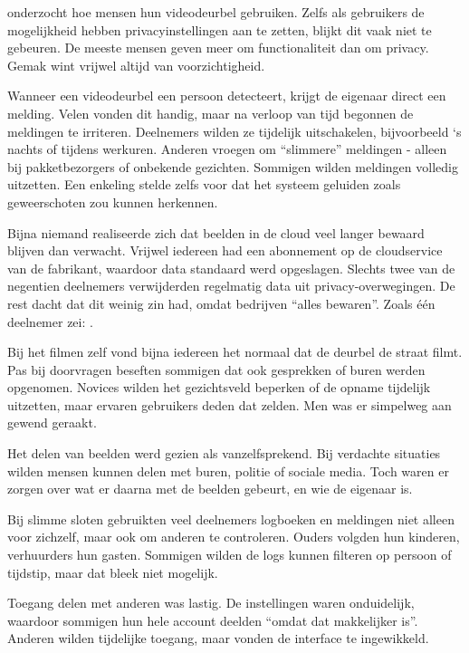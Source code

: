 \documentclass[nonacm, sigconf]{acmart}
\begin{document}
    \parencite{tabassum2023exploring} onderzocht hoe mensen hun videodeurbel gebruiken.
    Zelfs als gebruikers de mogelijkheid hebben privacyinstellingen aan te zetten, blijkt dit vaak niet te gebeuren.
    De meeste mensen geven meer om functionaliteit dan om privacy.
    Gemak wint vrijwel altijd van voorzichtigheid.

    Wanneer een videodeurbel een persoon detecteert, krijgt de eigenaar direct een melding.
    Velen vonden dit handig, maar na verloop van tijd begonnen de meldingen te irriteren.
    Deelnemers wilden ze tijdelijk uitschakelen, bijvoorbeeld `s nachts of tijdens werkuren.
    Anderen vroegen om ``slimmere'' meldingen - alleen bij pakketbezorgers of onbekende gezichten.
    Sommigen wilden meldingen volledig uitzetten.
    Een enkeling stelde zelfs voor dat het systeem geluiden zoals geweerschoten zou kunnen herkennen.

    Bijna niemand realiseerde zich dat beelden in de cloud veel langer bewaard blijven dan verwacht.
    Vrijwel iedereen had een abonnement op de cloudservice van de fabrikant, waardoor data standaard werd opgeslagen.
    Slechts twee van de negentien deelnemers verwijderden regelmatig data uit privacy-overwegingen.
    De rest dacht dat dit weinig zin had, omdat bedrijven ``alles bewaren''.
    Zoals één deelnemer zei:
    .

    Bij het filmen zelf vond bijna iedereen het normaal dat de deurbel de straat filmt.
    Pas bij doorvragen beseften sommigen dat ook gesprekken of buren werden opgenomen.
    Novices wilden het gezichtsveld beperken of de opname tijdelijk uitzetten, maar ervaren gebruikers deden dat zelden.
    Men was er simpelweg aan gewend geraakt.

    Het delen van beelden werd gezien als vanzelfsprekend.
    Bij verdachte situaties wilden mensen kunnen delen met buren, politie of sociale media.
    Toch waren er zorgen over wat er daarna met de beelden gebeurt, en wie de eigenaar is.

    Bij slimme sloten gebruikten veel deelnemers logboeken en meldingen niet alleen voor zichzelf, maar ook om anderen te controleren.
    Ouders volgden hun kinderen, verhuurders hun gasten.
    Sommigen wilden de logs kunnen filteren op persoon of tijdstip, maar dat bleek niet mogelijk.

    Toegang delen met anderen was lastig.
    De instellingen waren onduidelijk, waardoor sommigen hun hele account deelden ``omdat dat makkelijker is''.
    Anderen wilden tijdelijke toegang, maar vonden de interface te ingewikkeld.
\end{document}
